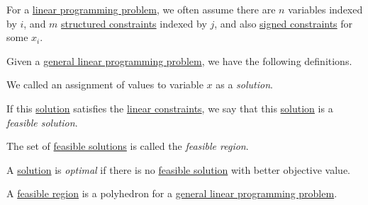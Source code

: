 \begin{remark}
	For a \hyperref[def:general-linear-programming-problem]{linear programming problem}, we often assume there are \(n\) variables indexed by \(i\), and \(m\) \hyperref[def:structured-constraint]{structured constraints} indexed by \(j\), and also \hyperref[def:signed-constraint]{signed constraints} for some \(x_i\).
\end{remark}

Given a \hyperref[def:general-linear-programming-problem]{general linear programming problem}, we have the following definitions.
\begin{definition}[Solution]\label{def:solution}
	We called an assignment of values to variable \(x\) as a \emph{solution}.

	\begin{definition}\label{def:feasible-solution}
		If this \hyperref[def:solution]{solution} satisfies the \hyperref[def:constraint]{linear constraints}, we say that this \hyperref[def:solution]{solution} is a \emph{feasible solution}.
	\end{definition}

	\begin{definition}\label{def:feasible-region}
		The set of \hyperref[def:feasible-solution]{feasible solutions} is called the \emph{feasible region}.
	\end{definition}

	\begin{definition}\label{def:optimal-solution}
		A \hyperref[def:solution]{solution} is \emph{optimal} if there is no \hyperref[def:feasible-solution]{feasible solution} with better objective value.
	\end{definition}
\end{definition}

\begin{remark}
	A \hyperref[def:feasible-region]{feasible region} is a polyhedron for a \hyperref[def:general-linear-programming-problem]{general linear programming problem}.
\end{remark}


